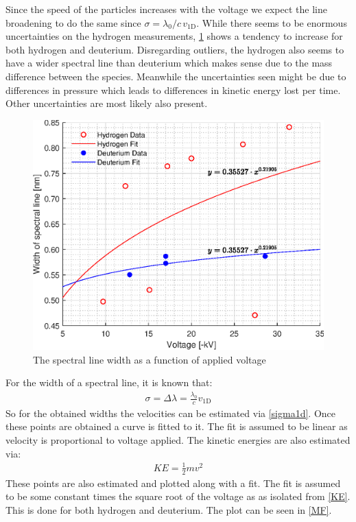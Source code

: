 Since the speed of the particles increases with the voltage we expect the line broadening to do the same since \(\sigma=\lambda_{0}/c\, v_{\mathrm{1D}}\). While there seems to be enormous uncertainties on the hydrogen measurements, \cref{Vsigma} shows a tendency to increase for both hydrogen and deuterium. Disregarding outliers, the hydrogen also seems to have a wider spectral line than deuterium which makes sense due to the mass difference between the species. Meanwhile the uncertainties seen might be due to differences in pressure which leads to differences in kinetic energy lost per time. Other uncertainties are most likely also present.
\begin{figure}
	\centering
	\includegraphics[width=.7\textwidth]{MatlabFigures/Asign3/VSigma.eps}
	\caption{The spectral line width as a function of applied voltage}
	\label{Vsigma}
\end{figure}
For the width of a spectral line, it is known that:
\begin{align}
	\sigma = \Delta\lambda = \frac{\lambda_0}{c} v_{\mathrm{1D}}\label{sigma1d}
\end{align}
So for the obtained widths the velocities can be estimated via \cref{sigma1d}. Once these points are obtained a curve is fitted to it. The fit is assumed to be linear as velocity is proportional to voltage applied. The kinetic energies are also estimated via:
\begin{align}
	KE = \frac{1}{2}mv^2\label{KE}
\end{align}
These points are also estimated and plotted along with a fit. The fit is assumed to be some constant times the square root of the voltage as as isolated from \cref{KE}. This is done for both hydrogen and deuterium. The plot can be seen in \cref{MF}.
